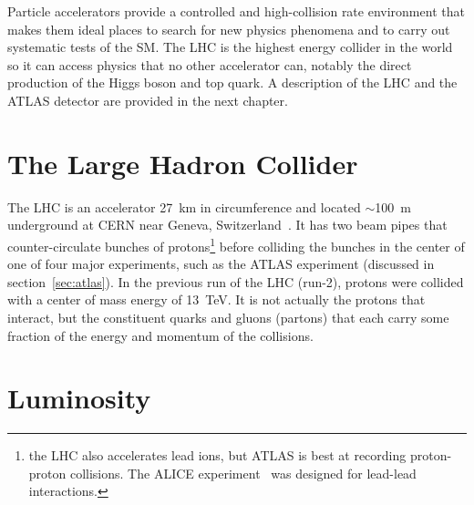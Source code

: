 Particle accelerators provide a controlled and high-collision rate environment that makes them ideal places to search for new physics phenomena and to carry out systematic tests of the SM. The LHC is the highest energy collider in the world so it can access physics that no other accelerator can, notably the direct production of the Higgs boson and top quark. A description of the LHC and the ATLAS detector are provided in the next chapter. 

\section{The Large Hadron Collider}

The LHC is an accelerator \SI{27}{\kilo\meter} in circumference and located $\sim$\SI{100}{\meter} underground at CERN near Geneva, Switzerland~\cite{evans_lhc_2008}. It has two beam pipes that counter-circulate bunches of protons\footnote{the LHC also accelerates lead ions, but ATLAS is best at recording proton-proton collisions. The ALICE experiment~\cite{alice_2008} was designed for lead-lead interactions.} before colliding the bunches in the center of one of four major experiments, such as the ATLAS experiment (discussed in section~\ref{sec:atlas}). In the previous run of the LHC (run-2), protons were collided with a center of mass energy of \SI{13}{\tera\electronvolt}. It is not actually the protons that interact, but the constituent quarks and gluons (partons) that each carry some fraction of the energy and momentum of the collisions.


\section{Luminosity}

